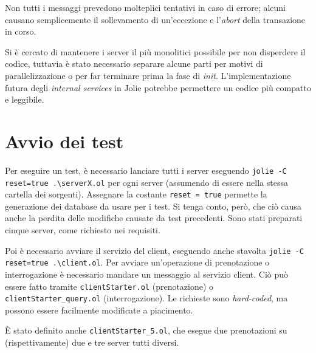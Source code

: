 \documentclass[a4paper]{article}
\begin{document}
Non tutti i messaggi prevedono molteplici tentativi in caso di errore; alcuni causano semplicemente il sollevamento di un'eccezione e l'\textit{abort} della transazione in corso.

Si è cercato di mantenere i server il più monolitici possibile per non disperdere il codice, tuttavia è stato necessario separare alcune parti per motivi di parallelizzazione o per far terminare prima la fase di \textit{init}. L'implementazione futura degli \textit{internal services} in Jolie potrebbe permettere un codice più compatto e leggibile.


\appendix

\section{Avvio dei test}

Per eseguire un test, è necessario lanciare tutti i server eseguendo \texttt{jolie -C reset=true .\textbackslash serverX.ol} per ogni server (assumendo di essere nella stessa cartella dei sorgenti). Assegnare la costante \texttt{reset = true} permette la generazione dei database da usare per i test. Si tenga conto, però, che ciò causa anche la perdita delle modifiche causate da test precedenti. Sono stati preparati cinque server, come richiesto nei requisiti.

Poi è necessario avviare il servizio del client, eseguendo anche stavolta  \texttt{jolie -C reset=true .\textbackslash client.ol}.
Per avviare un'operazione di prenotazione o interrogazione è necessario mandare un messaggio al servizio client. Ciò può essere fatto tramite \texttt{clientStarter.ol} (prenotazione) o \texttt{clientStarter\_query.ol} (interrogazione). Le richieste sono \textit{hard-coded}, ma possono essere facilmente modificate a piacimento.

\`E stato definito anche \texttt{clientStarter\_5.ol}, che esegue due prenotazioni su (rispettivamente) due e tre server tutti diversi.
\end{document}
